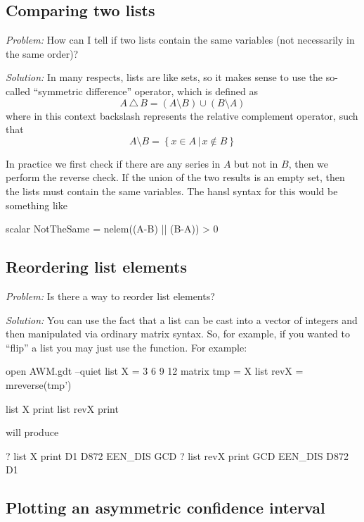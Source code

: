 \subsection{Comparing two lists}

\emph{Problem:} How can I tell if two lists contain the same variables
(not necessarily in the same order)?

\emph{Solution:} In many respects, lists are like sets, so it makes
sense to use the so-called ``symmetric difference'' operator, which is
defined as
\[
A\,\triangle\,B = (A \setminus B) \cup (B \setminus A)
\]
where in this context backslash represents the relative complement
operator, such that
\[
A \setminus B = \left\{ x \in A \,|\, x \not \in B \right\}
\]

In practice we first check if there are any series in $A$ but not in
$B$, then we perform the reverse check. If the union of the two
results is an empty set, then the lists must contain the same
variables. The hansl syntax for this would be something like

\begin{code}
scalar NotTheSame = nelem((A-B) || (B-A)) > 0
\end{code}

\subsection{Reordering list elements}

\emph{Problem:} Is there a way to reorder list elements?

\emph{Solution:} You can use the fact that a list can be cast into
a vector of integers and then manipulated via ordinary matrix
syntax. So, for example, if you wanted to ``flip'' a list you may
just use the  function. For example:
\begin{code}
open AWM.gdt --quiet
list X = 3 6 9 12
matrix tmp = X
list revX = mreverse(tmp')

list X print
list revX print
\end{code}
will produce
\begin{code}
? list X print
D1 D872 EEN_DIS GCD
? list revX print
GCD EEN_DIS D872 D1
\end{code}

\subsection{Plotting an asymmetric confidence interval}

